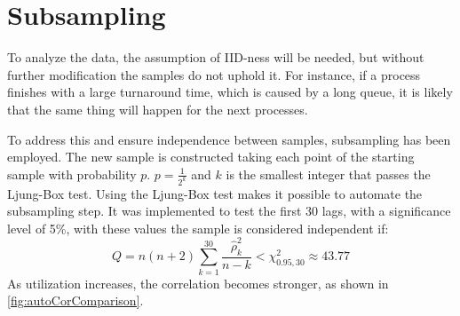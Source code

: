 

\section{Subsampling}

To analyze the data, the assumption of IID-ness will be needed, but without further modification the samples do not uphold it.
For instance, if a process finishes with a large turnaround time, which is caused by a long queue, it is likely that the same thing will happen for the next processes.

To address this and ensure independence between samples, subsampling has been employed. The new sample is constructed taking each point of the starting sample with probability $p$.
$p = \frac{1}{2^k}$ and $k$ is the smallest integer that passes the Ljung-Box test.
Using the Ljung-Box test makes it possible to automate the subsampling step. It was implemented to test the first 30 lags, with a significance level of 5\%, with these values the sample is considered independent if:
\vspace{-0.5\baselineskip}
\begin{equation}
    Q = n(n+2) \sum_{k=1}^{30} \frac{\hat{\rho}_k^2}{n-k} < \chi^2_{0.95,30} \approx 43.77
\end{equation}
As utilization increases, the correlation becomes stronger, as shown in \cref{fig:autoCorComparison}.

